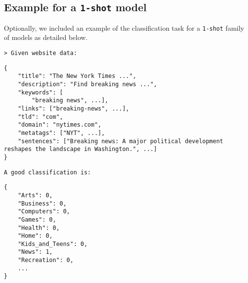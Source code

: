 \subsection{Example for a \texttt{1-shot} model}\label{app:example-1-shot}
Optionally, we included an example of the classification task for a \texttt{1-shot} family
of models as detailed below.

\begin{verbatim}
> Given website data:
\end{verbatim}

\begin{lstlisting}
{         
    "title": "The New York Times ...",
    "description": "Find breaking news ...",
    "keywords": [
        "breaking news", ...],
    "links": ["breaking-news", ...],
    "tld": "com",
    "domain": "nytimes.com",
    "metatags": ["NYT", ...],
    "sentences": ["Breaking news: A major political development reshapes the landscape in Washington.", ...]
}
\end{lstlisting}

\begin{verbatim}
A good classification is:
\end{verbatim}

\begin{lstlisting}
{
    "Arts": 0,
    "Business": 0,
    "Computers": 0,
    "Games": 0,
    "Health": 0,
    "Home": 0,
    "Kids_and_Teens": 0,
    "News": 1,
    "Recreation": 0,
    ...
}
\end{lstlisting}
